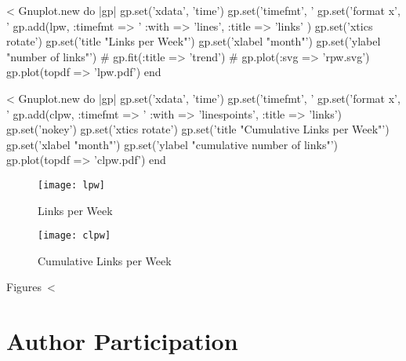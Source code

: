\documentclass{scrartcl}
\begin{document}
<%
Gnuplot.new do |gp|
	gp.set('xdata', 'time')
	gp.set('timefmt', '%
	gp.set('format x', '%
	gp.add(lpw, :timefmt => '%
		:with => 'lines', 
		:title => 'links' )
	gp.set('xtics rotate')
	gp.set('title "Links per Week"')
	gp.set('xlabel "month"')
	gp.set('ylabel "number of links"')
#	gp.fit(:title => 'trend')
#	gp.plot(:svg => 'rpw.svg')
	gp.plot(topdf => 'lpw.pdf')
end


<%
Gnuplot.new do |gp|
	gp.set('xdata', 'time')
	gp.set('timefmt', '%
	gp.set('format x', '%
	gp.add(clpw, :timefmt => '%
		:with => 'linespoints', 
		:title => 'links')
	gp.set('nokey')
	gp.set('xtics rotate')
	gp.set('title "Cumulative Links per Week"')
	gp.set('xlabel "month"')
	gp.set('ylabel "cumulative number of links"')
	gp.plot(topdf => 'clpw.pdf')
end
\begin{figure}
	\centering
	\texttt{[image: lpw]}
	\caption{Links per Week}
	\label{fig:links_per_week}
        \vfill

	\texttt{[image: clpw]}
	\caption{Cumulative Links per Week}
	\label{fig:cumulative_links_per_week}
\end{figure}



Figures~<%


\section{Author Participation} %
\label{sec:author_participation}
\end{document}
